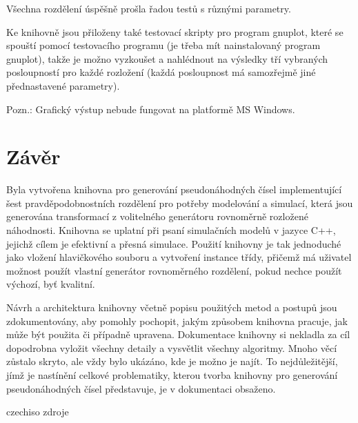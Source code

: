 \documentclass[a4paper,11pt]{article}
\begin{document}
Všechna rozdělení úspěšně prošla řadou testů s různými parametry. 

Ke knihovně jsou přiloženy také testovací skripty pro program gnuplot, které se spouští pomocí testovacího programu (je třeba mít nainstalovaný program gnuplot), takže je možno vyzkoušet a nahlédnout na výsledky tří vybraných posloupností pro každé rozložení (každá posloupnost má samozřejmě jiné přednastavené parametry).

Pozn.: Grafický výstup nebude fungovat na platformě MS Windows.

\section{Závěr}
Byla vytvořena knihovna pro generování pseudonáhodných čísel implementující šest pravděpodobnostních rozdělení pro potřeby modelování a simulací, která jsou generována transformací z volitelného generátoru rovnoměrně rozložené náhodnosti. Knihovna se uplatní při psaní simulačních modelů v jazyce C++, jejichž cílem je efektivní a přesná simulace. Použití knihovny je tak jednoduché jako vložení hlavičkového souboru a vytvoření instance třídy, přičemž má uživatel možnost použít vlastní generátor rovnoměrného rozdělení, pokud nechce použít výchozí, byť kvalitní.

Návrh a architektura knihovny včetně popisu použitých metod a postupů jsou zdokumentovány, aby pomohly pochopit, jakým způsobem knihovna pracuje, jak může být použita či případně upravena. Dokumentace knihovny si nekladla za cíl dopodrobna vyložit všechny detaily a vysvětlit všechny algoritmy. Mnoho věcí zůstalo skryto, ale vždy bylo ukázáno, kde je možno je najít. To nejdůležitější, jímž je nastínění celkové problematiky, kterou tvorba knihovny pro generování pseudonáhodných čísel představuje, je v dokumentaci obsaženo.

\newpage
\renewcommand{\refname}{Bibliografie}
 {czechiso}
 {zdroje}
\end{document}
